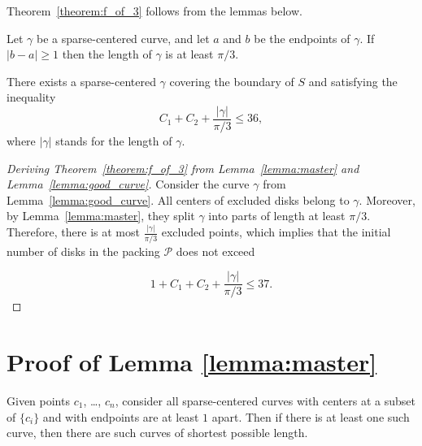 

Theorem~\ref{theorem:f_of_3} follows from the lemmas below.

\begin{lemma}
Let $\gamma$ be a sparse-centered curve, and let $a$ and $b$ be the endpoints of $\gamma$. If $|b - a|\geq 1$ then the length of $\gamma$ is at least $\pi/3$.
\label{lemma:master}
\end{lemma}

\begin{lemma}
\label{lemma:good_curve}
There exists a sparse-centered $\gamma$ covering the boundary of $S$ and satisfying the inequality
$$C_1 + C_2 + \frac{|\gamma|}{\pi/3} \leq 36,$$
where $|\gamma|$ stands for the length of $\gamma$.
\end{lemma}

\begin{proof}[Deriving Theorem~\ref{theorem:f_of_3} from Lemma~\ref{lemma:master} and Lemma~\ref{lemma:good_curve}]
Consider the curve $\gamma$ from Lemma~\ref{lemma:good_curve}. All centers of excluded disks belong to $\gamma$. Moreover, by Lemma~\ref{lemma:master}, they split $\gamma$ into parts of length at least $\pi/3$. Therefore, there is at most $\frac{|\gamma|}{\pi/3}$ excluded points, which implies that the initial number of disks in the packing $\mathcal{P}$ does not exceed

$$1 + C_1 + C_2 + \frac{|\gamma|}{\pi/3} \leq 37.$$
\end{proof}

\section{Proof of Lemma \ref{lemma:master}}

\begin{observation}
Given points $c_1$, \ldots, $c_n$, consider all sparse-centered curves with centers at a subset of $\{c_i\}$ and with endpoints are at least $1$ apart. Then if there is at least one such curve, then there are such curves of shortest possible length.
\end{observation}

